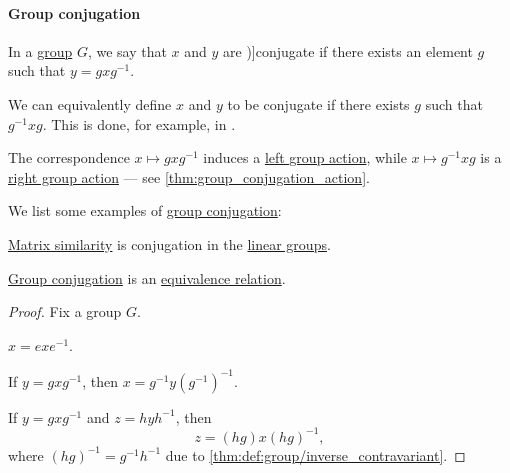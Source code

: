 \paragraph{Group conjugation}

\begin{definition}\label{def:group_conjugation}
  In a \hyperref[def:group]{group} \( G \), we say that \( x \) and \( y \) are \term[ru=сопряжённыё (елементы) (\cite[142]{Шафаревич2019ОсновныеПонятияАлгебры})]{conjugate} if there exists an element \( g \) such that \( y = g x g^{-1} \).
\end{definition}
\begin{comments}
  \item We can equivalently define \( x \) and \( y \) to be conjugate if there exists \( g \) such that \( g^{-1} x g \). This is done, for example, in \cite[55]{Курош1967ТеорияГрупп}.

  \item The correspondence \( x \mapsto g x g^{-1} \) induces a \hyperref[def:group_action]{left group action}, while \( x \mapsto g^{-1} x g \) is a \hyperref[def:group_action]{right group action} --- see \cref{thm:group_conjugation_action}.
\end{comments}

\begin{example}\label{ex:def:group_conjugation}
  We list some examples of \hyperref[def:group_conjugation]{group conjugation}:
  \begin{thmenum}
     \hyperref[def:similar_matrices]{Matrix similarity} is conjugation in the \hyperref[def:linear_groups]{linear groups}.
  \end{thmenum}
\end{example}

\begin{proposition}\label{thm:def:group_conjugation}
  \hyperref[def:group_conjugation]{Group conjugation} is an \hyperref[def:equivalence_relation]{equivalence relation}.
\end{proposition}
\begin{proof}
  Fix a group \( G \).

   \( x = e x e^{-1} \).

   If \( y = g x g^{-1} \), then \( x = g^{-1} y (g^{-1})^{-1} \).

   If \( y = g x g^{-1} \) and \( z = h y h^{-1} \), then
  \begin{equation*}
    z = (hg) x (hg)^{-1},
  \end{equation*}
  where \( (hg)^{-1} = g^{-1} h^{-1} \) due to \cref{thm:def:group/inverse_contravariant}.
\end{proof}

